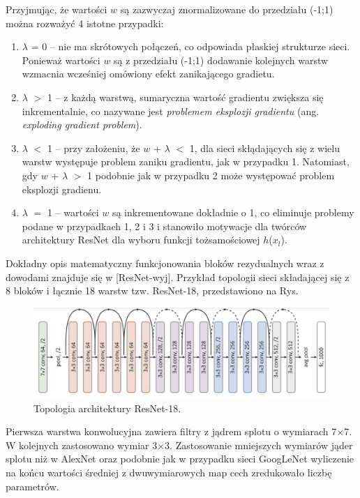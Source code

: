 Przyjmując, że wartości $w$ są zazwyczaj znormalizowane do przedziału (-1;1) można rozważyć 4 istotne przypadki:
\begin{enumerate}
	\item $\lambda$ = 0 -- nie ma skrótowych połączeń, co odpowiada płaskiej strukturze sieci. Ponieważ wartości $w$ są z przedziału (-1;1) dodawanie kolejnych warstw wzmacnia wcześniej omówiony efekt zanikającego gradietu.
	\item $\lambda$ $>$ 1 -- z każdą warstwą, sumaryczna wartość gradientu zwiększa się inkrementalnie, co nazywane jest \textit{problemem eksplozji gradientu} (ang. \textit{exploding gradient problem}).
	\item $\lambda$ $<$ 1 -- przy założeniu, że $w$ + $\lambda$ $<$ 1, dla sieci skłądających się z wielu warstw występuje problem zaniku gradientu, jak w przypadku 1. Natomiast, gdy $w$ + $\lambda$ $>$ 1 podobnie jak w przypadku 2 może występować problem eksplozji gradienu.
	\item $\lambda$ $=$ 1 -- wartości $w$ są inkrementowane dokładnie o 1, co eliminuje problemy podane w przypadkach 1, 2 i 3 i stanowiło motywacje dla twórców architektury ResNet dla wyboru funkcji tożsamościowej $h$($x_l$).
\end{enumerate}

Dokładny opis matematyczny funkcjonowania bloków rezydualnych wraz z dowodami znajduje się w [ResNet-wyj]. Przykład topologii sieci składającej się z 8 bloków i łącznie 18 warstw tzw. ResNet-18, przedstawiono na Rys.
\begin{figure}[h!]
	\centering
	\includegraphics[width=1\textwidth]{figures/ResNet.png}
	\caption{Topologia architektury ResNet-18.}
	\label{ResNetBlock}
\end{figure} 

Pierwsza warstwa konwolucyjna zawiera filtry z jądrem splotu o wymiarach 7$\times$7. W kolejnych zastosowano wymiar 3$\times$3. Zastosowanie mniejszych wymiarów jąder splotu niż w AlexNet oraz podobnie jak w przypadku sieci GoogLeNet wyliczenie na końcu wartości średniej z dwuwymiarowych map cech zredukowało liczbę parametrów.

